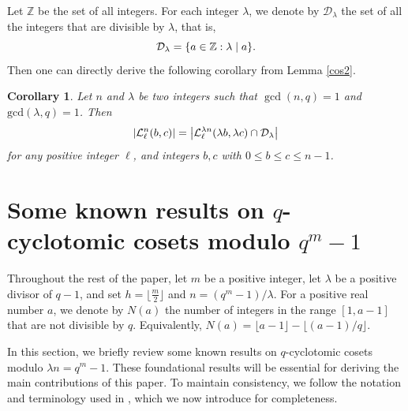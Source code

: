 \documentclass[journal,onecolumn]{IEEEtran}
\newtheorem{Corollary}{Corollary}
\begin{document}
Let $\mathbb{Z}$ be the set of all integers. For each integer $\lambda$, we denote by 
$\mathcal{D}_{\lambda}$  the set of all the integers that are divisible by $\lambda$, that is, 
 \begin{equation}\notag
    \mathcal{D}_{\lambda}=\{a\in \mathbb{Z}:\lambda\mid a\}.
\end{equation} 
Then one can directly derive  the following corollary from Lemma \ref{cos2}.
\begin{Corollary}\label{cor1}
Let $n$ and $\lambda$ be   two  integers such that  $\gcd(n,q)=1
 $  and  $\mathrm{gcd}(\lambda,q)=1$.
 Then  
 \begin{equation}\notag
     \left |   \mathcal{L}_{\ell}^{n}(b,c)  \right| =  \left |   \mathcal{L}^{\lambda n}_{\ell}(\lambda b,\lambda c)\cap \mathcal{D}_{\lambda}\right|
 \end{equation}
 for any  positive integer  $\ell $, and  integers $b,c$ with $0\leq b\leq c\leq n-1$.  
\end{Corollary}






 











\section{Some known results on \texorpdfstring{$q$}\ -cyclotomic cosets  modulo \texorpdfstring{$q^m-1$}\ }\label{review} 
Throughout the rest of the paper,  let  $m$ be a positive integer, let  $\lambda$ be a  positive divisor of $q-1$, and  set  $h=\lfloor\frac{m}{2}\rfloor$  and $n=(q^m-1)/\lambda$.   
For  a positive real number $a$, we denote by   $N(a)$ the number of integers in the range $[1,a-1]$ that   are not divisible by $q$.  Equivalently, $
    N(a) = \lfloor a-1\rfloor-\lfloor (a-1)/{q}\rfloor. 
$

In this section, we briefly review some known results on   $q$-cyclotomic cosets modulo 
$\lambda n=q^m -1$.   These foundational results will be essential for deriving the main contributions of this paper. 
To maintain consistency, we follow the notation and terminology used in \cite{zheng2025}, which we now introduce for completeness.
\end{document}
